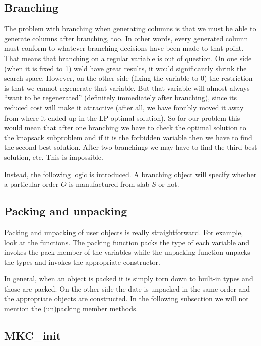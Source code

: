 \subsection{Branching}
The problem with branching when generating columns is that we must be able to
generate columns after branching, too. In other words, every generated column
must conform to whatever branching decisions have been made to that point.
That means that branching on a regular variable is out of question. On one
side (when it is fixed to 1) we'd have great results, it would significantly
shrink the search space. However, on the other side (fixing the variable to 0)
the restriction is that we cannot regenerate that variable. But that variable
will almost always ``want to be regenerated'' (definitely immediately after
branching), since its reduced cost will make it attractive (after all, we have
forcibly moved it away from where it ended up in the LP-optimal solution). So
for our problem this would mean that after one branching we have to check the
optimal solution to the knapsack subproblem and if it is the forbidden
variable then we have to find the second best solution. After two branchings
we may have to find the third best solution, etc. This is impossible. 

Instead, the following logic is introduced. A branching object will specify
whether a particular order $O$ is manufactured from slab $S$ or not.

\subsection{Packing and unpacking}

Packing and unpacking of user objects is really straightforward. For example,
look at the  functions. The packing function packs
the 
type of each variable and invokes the pack member of the variables while the
unpacking function unpacks the types and invokes the appropriate constructor. 

In general, when an object is packed it is simply torn down to built-in types
and those are packed. On the other side the date is unpacked in the same order
and the appropriate objects are constructed. In the following subsection we
will not mention the (un)packing member methods.

\subsection{MKC\_init}

